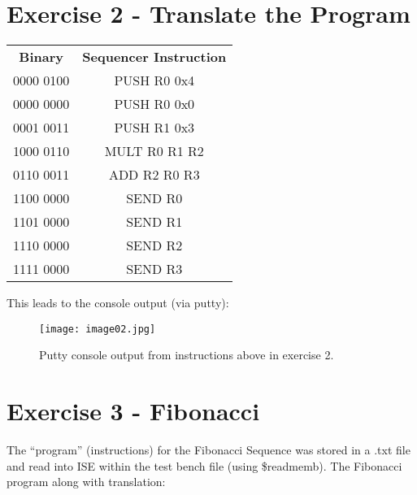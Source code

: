 \documentclass{article}
\begin{document}
 

\section*{Exercise 2 - Translate the Program}

\begin{center}
\begin{tabular}{ c c}

 \textbf{Binary} & \textbf{Sequencer Instruction} \\ 
 0000 0100 & PUSH R0 0x4 \\  
 0000 0000 & PUSH R0 0x0 \\
0001 0011 & PUSH R1 0x3 \\
1000 0110 & MULT R0 R1 R2 \\
0110 0011 & ADD R2 R0 R3 \\
1100 0000 & SEND R0 \\
1101 0000 & SEND R1 \\
1110 0000 & SEND R2 \\
1111 0000 & SEND R3 \\
 
\end{tabular}
\end{center}

This leads to the console output (via putty):

\begin{figure}[H]
\begin{center}
\texttt{[image: image02.jpg]} %
\caption{Putty console output from instructions above in exercise 2.}
\end{center}
\end{figure}



\section*{Exercise 3 - Fibonacci}

The  ``program'' (instructions) for the Fibonacci Sequence was stored in a .txt file and read into ISE within the test bench file (using \$readmemb).  The Fibonacci program along with translation:
\end{document}
